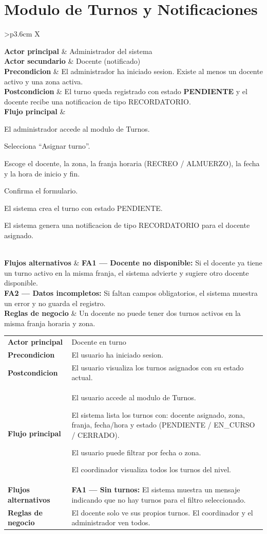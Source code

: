 \documentclass[12pt, a4paper]{article}
\newcommand{\cu}[3]{%
  \begin{tcolorbox}[casousostyle, title={#1},
    after title={\hfill\small\normalfont\color{white!80!azulOscuro}#2}]
  \renewcommand{\arraystretch}{1.35}
  \begin{tabularx}{\linewidth}{>{\bfseries\color{azulOscuro}\small}p{3.6cm} X}
  #3
  \end{tabularx}
  \end{tcolorbox}
  \vspace{6pt}
}
\newcommand{\fcu}[2]{\small\textbf{\color{azulOscuro}#1} & \small #2 \\}
\begin{document}
\newpage

\section{Modulo de Turnos y Notificaciones}

\cu{CU-01 --- Asignar turno de vigilancia}{Administrador}{
  \fcu{Actor principal}{Administrador del sistema}
  \fcu{Actor secundario}{Docente (notificado)}
  \fcu{Precondicion}{El administrador ha iniciado sesion. Existe al menos un docente activo y una zona activa.}
  \fcu{Postcondicion}{El turno queda registrado con estado \textbf{PENDIENTE} y el docente recibe una notificacion de tipo RECORDATORIO.}
  \fcu{Flujo principal}{
    \begin{pasos}
      \item El administrador accede al modulo de Turnos.
      \item Selecciona ``Asignar turno''.
      \item Escoge el docente, la zona, la franja horaria (RECREO / ALMUERZO), la fecha y la hora de inicio y fin.
      \item Confirma el formulario.
      \item El sistema crea el turno con estado PENDIENTE.
      \item El sistema genera una notificacion de tipo RECORDATORIO para el docente asignado.
    \end{pasos}
  }
  \fcu{Flujos alternativos}{
    \textbf{FA1 --- Docente no disponible:} Si el docente ya tiene un turno activo en la misma franja, el sistema advierte y sugiere otro docente disponible. \\[4pt]
    \textbf{FA2 --- Datos incompletos:} Si faltan campos obligatorios, el sistema muestra un error y no guarda el registro.
  }
  \fcu{Reglas de negocio}{Un docente no puede tener dos turnos activos en la misma franja horaria y zona.}
}

\cu{CU-02 --- Visualizar calendario de turnos}{Docente / Coordinador / Admin}{
  \fcu{Actor principal}{Docente en turno}
  \fcu{Precondicion}{El usuario ha iniciado sesion.}
  \fcu{Postcondicion}{El usuario visualiza los turnos asignados con su estado actual.}
  \fcu{Flujo principal}{
    \begin{pasos}
      \item El usuario accede al modulo de Turnos.
      \item El sistema lista los turnos con: docente asignado, zona, franja, fecha/hora y estado (PENDIENTE / EN\_CURSO / CERRADO).
      \item El usuario puede filtrar por fecha o zona.
      \item El coordinador visualiza todos los turnos del nivel.
    \end{pasos}
  }
  \fcu{Flujos alternativos}{
    \textbf{FA1 --- Sin turnos:} El sistema muestra un mensaje indicando que no hay turnos para el filtro seleccionado.
  }
  \fcu{Reglas de negocio}{El docente solo ve sus propios turnos. El coordinador y el administrador ven todos.}
}
\end{document}
